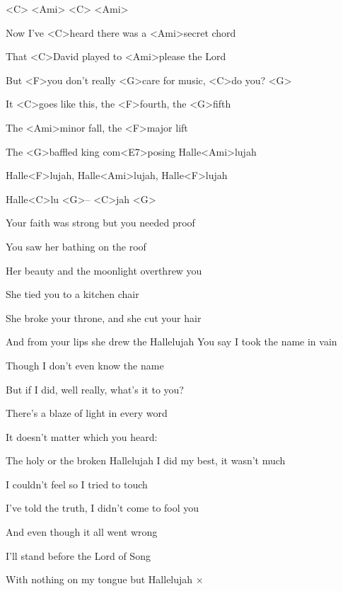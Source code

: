 

<C> <Ami> <C> <Ami>

\zs
Now I've <C>heard there was a <Ami>secret chord

That <C>David played to <Ami>please the Lord

But <F>you don't really <G>care for music, <C>do you? <G>

It <C>goes like this, the <F>fourth, the <G>fifth

The <Ami>minor fall, the <F>major lift

The <G>baffled king com<E7>posing Halle<Ami>lujah
\ks

\zr
Halle<F>lujah, Halle<Ami>lujah, Halle<F>lujah

Halle<C>lu <G>-- <C>jah <G>
\kr

\zs
Your faith was strong but you needed proof

You saw her bathing on the roof

Her beauty and the moonlight overthrew you

She tied you to a kitchen chair

She broke your throne, and she cut your hair

And from your lips she drew the Hallelujah
\ks
\zr \kr
\zs
You say I took the name in vain

Though I don't even know the name

But if I did, well really, what's it to you?

There's a blaze of light in every word

It doesn't matter which you heard:

The holy or the broken Hallelujah
\ks
\zr \kr
\zs
I did my best, it wasn't much

I couldn't feel so I tried to touch

I've told the truth, I didn't come to fool you

And even though it all went wrong

I'll stand before the Lord of Song

With nothing on my tongue but Hallelujah
\ks
{}× \kr
\kp
